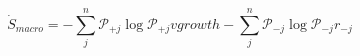\begin{equation}
\dot S_{macro} = -\sum_j^n\mathcal P_{+j}\log\mathcal P_{+j}v{growth} -\sum_j^n\mathcal P_{-j}\log\mathcal P_{-j} r_{-j}
\end{equation}